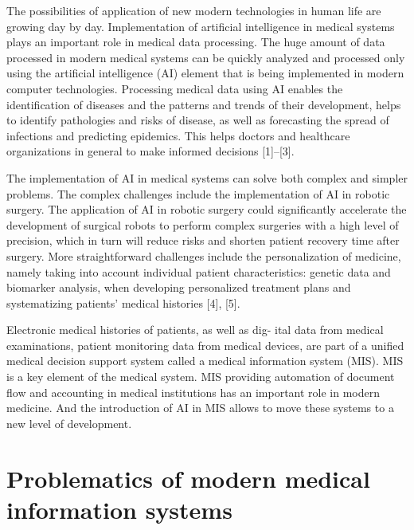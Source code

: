 \documentclass[10pt, a4paper]{article}
\begin{document}
\begin{multicols}{2}
\par The possibilities of application of new modern technologies in human life are growing day by day. Implementation of artificial intelligence in medical systems
plays an important role in medical data processing.
The huge amount of data processed in modern medical
systems can be quickly analyzed and processed only
using the artificial intelligence (AI) element that is being
implemented in modern computer technologies. Processing medical data using AI enables the identification of
diseases and the patterns and trends of their development,
helps to identify pathologies and risks of disease, as well
as forecasting the spread of infections and predicting epidemics. This helps doctors and healthcare organizations
in general to make informed decisions [1]–[3].
\par The implementation of AI in medical systems can
solve both complex and simpler problems. The complex challenges include the implementation of AI in
robotic surgery. The application of AI in robotic surgery
could significantly accelerate the development of surgical
robots to perform complex surgeries with a high level of
precision, which in turn will reduce risks and shorten
patient recovery time after surgery. More straightforward challenges include the personalization of medicine,
namely taking into account individual patient characteristics: genetic data and biomarker analysis, when developing personalized treatment plans and systematizing
patients’ medical histories [4], [5].
\par Electronic medical histories of patients, as well as dig-
ital data from medical examinations, patient monitoring
data from medical devices, are part of a unified medical
decision support system called a medical information
system (MIS). MIS is a key element of the medical
system. MIS providing automation of document flow
and accounting in medical institutions has an important
role in modern medicine. And the introduction of AI
in MIS allows to move these systems to a new level of
development.

\section{Problematics of modern medical information
systems}


\end{multicols}
\end{document}
